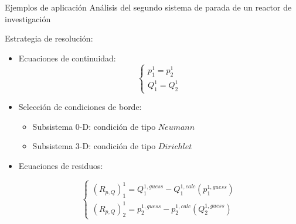 \normalsize
\begin{frame}
{Ejemplos de aplicación}
{Análisis del segundo sistema de parada de un reactor de investigación}

Estrategia de resolución: 
\begin{itemize}
\item Ecuaciones de continuidad:
\begin{equation*}
\left\{ \begin{array}{l}
p_1^1 = p_2^1 \\
Q_1^1 = Q_2^1
\end{array}
\right.
\end{equation*}
\item <2-> Selección de condiciones de borde:
    \begin{itemize}
    \item Subsistema 0-D: condición de tipo $Neumann$
    \item Subsistema 3-D: condición de tipo $Dirichlet$
    \end{itemize}
\item <3-> Ecuaciones de residuos:

\begin{equation*}
\left\{ \begin{array}{l}
(R_{p,Q})_{1}^{1} =Q_1^{1,guess} - Q_1^{1,calc}(p_1^{1,guess}) \\
(R_{p,Q})_{2}^{1} =p_2^{1,guess} - p_2^{1,calc}(Q_2^{1,guess})
\end{array}
\right.
\end{equation*}

\end{itemize}

\end{frame}



